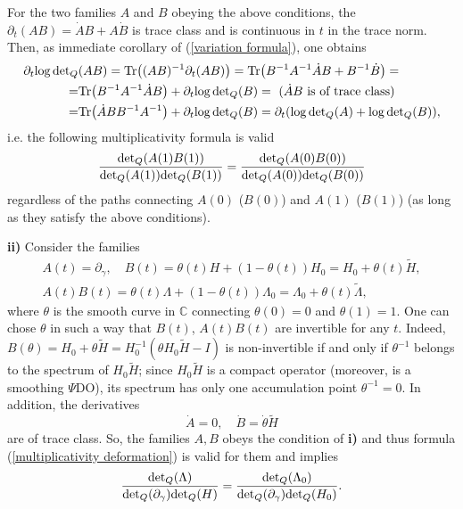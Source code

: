 \documentclass{amsart}
\begin{document}
For the two families $A$ and $B$ obeying the above conditions, the $\partial_t(AB)=\dot{A}B+A\dot{B}$ is trace class and is continuous in $t$ in the trace norm. Then, as immediate corollary of (\ref{variation formula}), one obtains
\begin{align*}
\partial_t{\rm log}\,{\rm det}_Q&(AB)={\rm Tr}\big((AB)^{-1}\partial_t(AB)\big)={\rm Tr}\big(B^{-1}A^{-1}\dot{A}B+B^{-1}\dot{B}\big)=\\
=&{\rm Tr}\big(B^{-1}A^{-1}\dot{A}B\big)+\partial_t{\rm log}\,{\rm det}_Q(B)= \ \text{($\dot{A}B$ is of trace class)}\\
=&{\rm Tr}\big(\dot{A}BB^{-1}A^{-1}\big)+\partial_t{\rm log}\,{\rm det}_Q(B)=\partial_t({\rm log}\,{\rm det}_Q(A)+{\rm log}\,{\rm det}_Q(B)),
\end{align*}
i.e. the following multiplicativity formula is valid
\begin{align}
\label{multiplicativity deformation}
\frac{{\rm det}_Q(A(1)B(1))}{{\rm det}_Q(A(1)){\rm det}_Q(B(1))}=\frac{{\rm det}_Q(A(0)B(0))}{{\rm det}_Q(A(0)){\rm det}_Q(B(0))}
\end{align}
regardless of the paths connecting $A(0)$ ($B(0)$) and $A(1)$ ($B(1)$) (as long as they satisfy the above conditions).

{\bf ii)} Consider the families 
\begin{align*}
A(t)=\partial_\gamma, \quad B(t)=\theta(t)H+(1-\theta(t))H_0=H_0+\theta(t)\tilde{H}, \\ 
A(t)B(t)=\theta(t)\Lambda+(1-\theta(t))\Lambda_0=\Lambda_0+\theta(t)\tilde{\Lambda},
\end{align*}
where $\theta$ is the smooth curve in $\mathbb{C}$ connecting $\theta(0)=0$ and $\theta(1)=1$. One can chose $\theta$ in such a way that $B(t)$, $A(t)B(t)$ are invertible for any $t$. Indeed, $B(\theta)=H_0+\theta\tilde{H}=H_0^{-1}(\theta H_0\tilde{H}-I)$ is non-invertible if and only if $\theta^{-1}$ belongs to the spectrum of $H_0\tilde{H}$; since $H_0\tilde{H}$ is a compact operator (moreover, is a smoothing $\Psi$DO), its spectrum has only one accumulation point $\theta^{-1}=0$. In addition, the derivatives
$$\dot{A}=0, \quad \dot{B}=\dot{\theta}\tilde{H}$$
are of trace class. So, the families $A,B$ obeys the condition of {\bf i)} and thus formula (\ref{multiplicativity deformation}) is valid for them and implies
\begin{align}
\label{multiplicativity DN Hilbert diff}
\frac{{\rm det}_Q(\Lambda)}{{\rm det}_Q(\partial_\gamma){\rm det}_Q(H)}=\frac{{\rm det}_Q(\Lambda_0)}{{\rm det}_Q(\partial_\gamma){\rm det}_Q(H_0)}.
\end{align}
\end{document}
